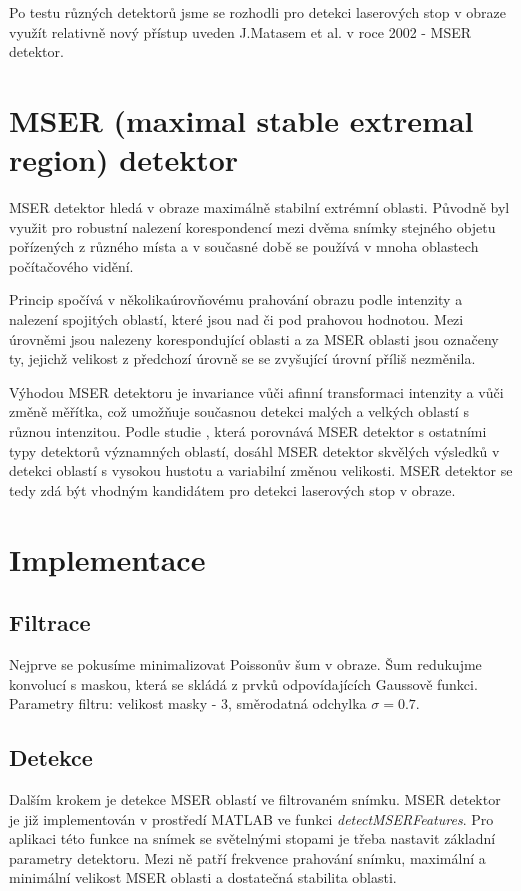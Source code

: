 Po testu různých detektorů jsme se rozhodli pro detekci laserových stop v obraze využít relativně nový přístup uveden J.Matasem et al. \cite{Matas} v roce 2002 - MSER detektor. 




\section{MSER (maximal stable extremal region) detektor}

MSER detektor hledá v obraze maximálně stabilní extrémní oblasti. Původně byl využit pro robustní nalezení korespondencí mezi dvěma snímky stejného objetu pořízených z různého místa a v současné době se používá v mnoha oblastech počítačového vidění.  

Princip spočívá v několikaúrovňovému prahování obrazu podle intenzity a nalezení spojitých oblastí, které jsou nad či pod prahovou hodnotou. Mezi úrovněmi jsou nalezeny korespondující oblasti a za MSER oblasti jsou označeny ty, jejichž velikost z předchozí úrovně se se zvyšující úrovní příliš nezměnila. 

Výhodou MSER detektoru je invariance vůči afinní transformaci intenzity a vůči změně měřítka, což umožňuje současnou detekci malých a velkých oblastí s různou intenzitou. Podle studie \cite{Comparison}, která porovnává MSER detektor s ostatními typy detektorů významných oblastí, dosáhl MSER detektor skvělých výsledků v detekci oblastí s vysokou hustotu a variabilní změnou velikosti. MSER detektor se tedy zdá být vhodným kandidátem pro detekci laserových stop v obraze.

\section{Implementace}

\subsection{Filtrace}
   Nejprve se pokusíme minimalizovat Poissonův šum v obraze. Šum redukujme konvolucí s maskou, která se skládá z prvků odpovídajících Gaussově funkci. Parametry filtru: velikost masky - \SI{3}{\px}, směrodatná odchylka $\sigma = 0.7$.

\subsection{Detekce} 
   Dalším krokem je detekce MSER oblastí ve filtrovaném snímku. MSER detektor je již implementován v prostředí MATLAB ve funkci \textit{detectMSERFeatures}. Pro aplikaci této funkce na snímek se světelnými stopami je třeba nastavit základní parametry detektoru. Mezi ně patří frekvence prahování snímku, maximální a minimální velikost MSER oblasti a dostatečná stabilita oblasti. 
   
